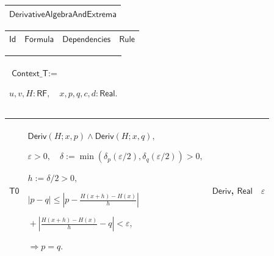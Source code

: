 \documentclass[11pt]{amsart}
\renewcommand{\arraystretch}{1.4}
\newlength{\FTCOneColumnBody}
\newlength{\FTCFourColumnBody}
\begin{document}
{\centering
\renewcommand{\arraystretch}{1.4}
\par\setlength{\parskip}{0pt}\nointerlineskip
\noindent
\begin{tabular}{|@{}>{\centering\arraybackslash}m{\FTCOneColumnBody}|}\hline
$\displaystyle \textsf{DerivativeAlgebraAndExtrema}$\\ \hline
\end{tabular}%
\par\setlength{\parskip}{0pt}\nointerlineskip
\noindent
\begin{tabular}{|@{}>{\centering\arraybackslash}m{0.078431\FTCFourColumnBody}|>{\centering\arraybackslash}m{0.535947\FTCFourColumnBody}|>{\centering\arraybackslash}m{0.281045\FTCFourColumnBody}|>{\centering\arraybackslash}m{0.104575\FTCFourColumnBody}|}\hline
$\displaystyle \textsf{Id}$ & $\displaystyle \textsf{Formula}$ & $\displaystyle \textsf{Dependencies}$ & $\displaystyle \textsf{Rule}$\\ \hline
\end{tabular}%
\par\setlength{\parskip}{0pt}\nointerlineskip
\noindent
\begin{tabular}{|@{}>{\centering\arraybackslash}m{\FTCOneColumnBody}|}\hline
$\displaystyle \textsf{Context\_T}:=$\par
$\displaystyle u,v,H:\textsf{RF},\quad x,p,q,c,d:\textsf{Real}.$\\ \hline
\end{tabular}%
\par\setlength{\parskip}{0pt}\nointerlineskip
\noindent
\begin{tabular}{|@{}>{\centering\arraybackslash}m{0.078431\FTCFourColumnBody}|>{\centering\arraybackslash}m{0.535947\FTCFourColumnBody}|>{\centering\arraybackslash}m{0.281045\FTCFourColumnBody}|>{\centering\arraybackslash}m{0.104575\FTCFourColumnBody}|}\hline
\hypertarget{proof:T0}{$\displaystyle \textsf{T0}$} & $\displaystyle \textsf{Deriv}(H;x,p)\land\textsf{Deriv}(H;x,q),$\par
$\displaystyle \varepsilon>0,\quad\delta:=\min(\delta_p(\varepsilon/2),\delta_q(\varepsilon/2))>0,$\par
$\displaystyle h:=\delta/2>0,$\par
$\displaystyle |p-q|\le\left|p-\frac{H(x+h)-H(x)}h\right|$\par
$\displaystyle {}+\left|\frac{H(x+h)-H(x)}h-q\right|<\varepsilon,$\par
$\displaystyle \Rightarrow p=q.$ & \hyperlink{def:Deriv}{$\displaystyle \textsf{Deriv}$}, \hyperlink{ax:Real}{$\displaystyle \textsf{Real}$} & $\displaystyle \varepsilon$\\ \hline

\end{tabular}}
\end{document}
